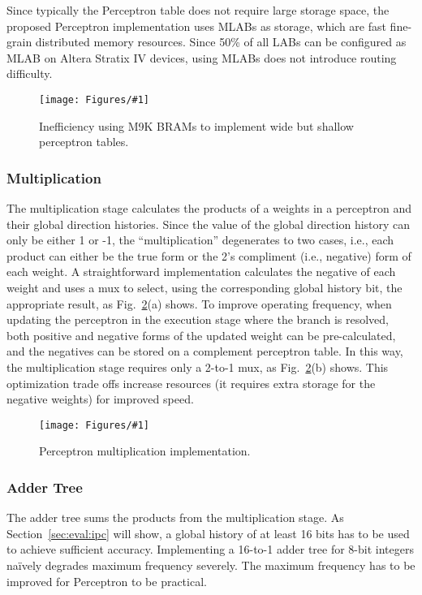 \documentclass[conference]{IEEEtran}
\newcommand{\kfig}[4]{ %
        \begin{figure}[!t]
        \centering
        \texttt{[image: Figures/\#1]}
        \vspace{-1mm}
        \caption{#3}
        \label{#2}
        \end{figure}
}
\begin{document}
Since typically the Perceptron table does not require large storage space, the proposed Perceptron implementation uses MLABs as storage, which are fast fine-grain distributed memory resources. Since 50\% of all LABs can be configured as MLAB on Altera Stratix IV devices, using MLABs does not introduce routing difficulty.
\kfig{perceptronTable.pdf}{fig:perceptronTable}{Inefficiency using M9K BRAMs to implement wide but shallow perceptron tables.}{angle = 0, trim = 1in 2in 3.4in 0.5in, clip, width=0.3\textwidth}


\subsubsection{Multiplication}
\label{sec:fpga:perceptron:mult}
The multiplication stage calculates the products of a weights in a perceptron and their global direction histories. Since the value of the global direction history can only be either 1 or -1, the ``multiplication'' degenerates to two cases, i.e., each product can either be the true form or the 2's compliment (i.e., negative) form of each weight. A straightforward implementation calculates the negative of each weight and uses a mux to select, using the corresponding global history bit, the appropriate result, as Fig.~\ref{fig:perceptronMult}(a) shows. To improve operating frequency, when updating the perceptron in the execution stage where the branch is resolved, both positive and negative forms of the updated weight can be pre-calculated, and the negatives can be stored on a complement perceptron table. In this way, the multiplication stage requires only a 2-to-1 mux, as Fig.~\ref{fig:perceptronMult}(b) shows. This optimization trade offs increase resources (it requires extra storage for the negative weights) for improved speed.
\kfig{perceptronMult.pdf}{fig:perceptronMult}{Perceptron multiplication implementation.}{angle = 0, trim = 0.3in 2in 3in 0.6in, clip, width=0.4\textwidth}

\subsubsection{Adder Tree}
\label{sec:fpga:perceptron:adder}
The adder tree sums the products from the multiplication stage. As Section~\ref{sec:eval:ipc} will show, a global history of at least 16 bits has to be used to achieve sufficient accuracy. Implementing a 16-to-1 adder tree for 8-bit integers na\"ively degrades maximum frequency severely. The maximum frequency has to be improved for Perceptron to be practical.
\end{document}
